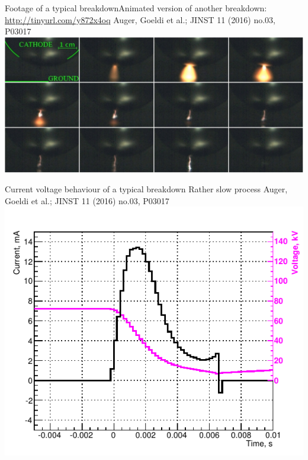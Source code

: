 \documentclass[]{beamer}
\newcommand*{\emphcoltitle}{blue}
\begin{document}
\begin{frame}{Footage of a typical breakdown}{Animated version of another breakdown: \url{http://tinyurl.com/y872x4oq}}
	{\tiny Auger, Goeldi et al.; JINST 11 (2016) no.03, P03017~\cite{breakdown_16}}\\
	\centering
	\includegraphics[width=\textwidth]{hv/montage}
\end{frame}

\begin{frame}{Current voltage behaviour of a typical breakdown}{\color{\emphcoltitle} Rather slow process}
	{\tiny Auger, Goeldi et al.; JINST 11 (2016) no.03, P03017~\cite{breakdown_16}}\\
	\centering
	\includegraphics[height=.75\textheight]{hv/IVcorr}
\end{frame}
\end{document}
